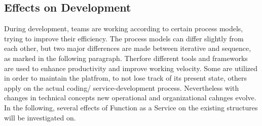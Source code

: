 \documentclass[a4paper,11pt, pagesize]{scrartcl}
\begin{document}
\begin{spacing}{1.2}
\subsection{Effects on Development}During development, teams are working according to certain process models, trying to improve their efficiency. The process models can differ slightly from each other, but two major differences are made between iterative and sequence, as marked in the following paragraph. Therfore different tools and frameworks are used to enhance productivity and improve working velocity. Some are utilized in order to maintain the platfrom, to not lose track of its present state, others apply on the actual coding/ service-development process. Nevertheless with changes in technical concepts new operational and organizational cahnges evolve. In the following, several effects of Function as a Service on the existing structures will be investigated on. %

\end{spacing}
\end{document}
